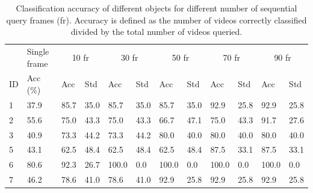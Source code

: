 \begin{table}
\centering
\begin{tabularx}{1.05\linewidth}{XXXXXXXXXXXX}
\toprule
& Single frame & \multicolumn{2}{c}{10 fr} & \multicolumn{2}{c}{30 fr} & \multicolumn{2}{c}{50 fr} & \multicolumn{2}{c}{70 fr} & \multicolumn{2}{c}{90 fr}\\
ID & Acc (\%) & Acc & Std & Acc & Std & Acc & Std & Acc & Std & Acc & Std \\
\midrule
1 & 37.9 & 85.7 & 35.0 & 85.7 & 35.0 & 85.7 & 35.0 & 92.9 & 25.8 & 92.9 & 25.8 \\
2 & 55.6 & 75.0 & 43.3 & 75.0 & 43.3 & 66.7 & 47.1 & 75.0 & 43.3 & 91.7 & 27.6\\
3 & 40.9 & 73.3 & 44.2 & 73.3 & 44.2 & 80.0 & 40.0 & 80.0 & 40.0 & 80.0 & 40.0\\
5 & 43.1 & 62.5 & 48.4 & 62.5 & 48.4 & 62.5 & 48.4 & 87.5 & 33.1  & 87.5 & 33.1\\
6 & 80.6 & 92.3 & 26.7 & 100.0 & 0.0 & 100.0 & 0.0 & 100.0 & 0.0  & 100.0 & 0.0\\
7 & 46.2 & 78.6 & 41.0 & 78.6 & 41.0 & 92.9 & 25.8 & 92.9 & 25.8  & 92.9 & 25.8\\
\bottomrule
\end{tabularx}
\caption{Classification accuracy of different objects for different number of sequential query frames (fr). Accuracy is defined as the number of videos correctly classified divided by the total number of videos queried.}
\label{table:testData}
\end{table}





